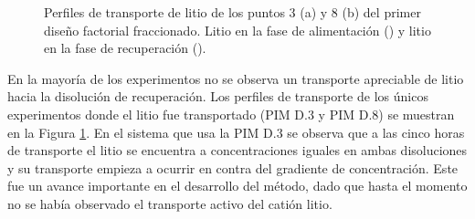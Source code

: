\begin{figure}[H]
    \centering
    \caption[Perfiles de transporte de litio membranas primer diseño factorial fraccionado.]{Perfiles de transporte de litio de los puntos 3 (a) y 8 (b) del primer diseño factorial fraccionado. Litio en la fase de alimentación (\protect\squareblck) y litio en la fase de recuperación (\protect\squarewht).}        
    \label{fig:FrF2_1.profiles}
\end{figure}

En la mayoría de los experimentos no se observa un transporte apreciable de litio hacia la diso\-lución de recuperación. Los perfiles de transporte de los únicos experimentos donde el litio fue transportado (PIM D.3 y PIM D.8) se muestran en la Figura \ref{fig:FrF2_1.profiles}. En el sistema que usa la PIM D.3 se observa que a las cinco horas de transporte el litio se encuentra a concentraciones iguales en ambas disoluciones y su transporte empieza a ocurrir en contra del gradiente de concentración. Este fue un avance importante en el desarrollo del método, dado que hasta el momento no se había observado el transporte activo del catión litio.

